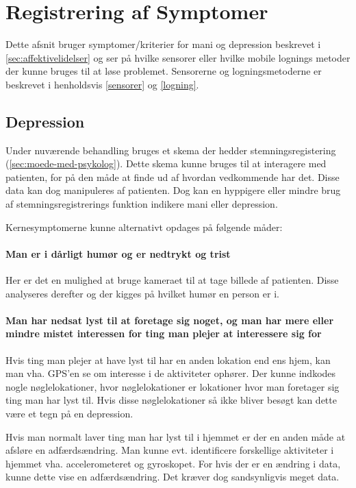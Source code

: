 \section{Registrering af Symptomer}
Dette afsnit bruger symptomer/kriterier for mani og depression beskrevet i \cref{sec:affektivelidelser} og ser på hvilke sensorer eller hvilke mobile lognings metoder der kunne bruges til at løse problemet.
Sensorerne og logningsmetoderne er beskrevet i henholdsvis \cref{sensorer} og \cref{logning}.

\subsection{Depression}
Under nuværende behandling bruges et skema der hedder stemningsregistering (\cref{sec:moede-med-psykolog}). Dette skema kunne bruges til at interagere med patienten, for på den måde at finde ud af hvordan vedkommende har det. Disse data kan dog manipuleres af patienten. Dog kan en hyppigere eller mindre brug af stemningsregistrerings funktion indikere mani eller depression.

Kernesymptomerne kunne alternativt opdages på følgende måder:

\paragraph{Man er i dårligt humør og er nedtrykt og trist}\label{darligthumor}
Her er det en mulighed at bruge kameraet til at tage billede af patienten. Disse analyseres derefter og der kigges på hvilket humør en person er i.

\paragraph{Man har nedsat lyst til at foretage sig noget, og man har mere eller mindre mistet interessen for ting man plejer at interessere sig for}
Hvis ting man plejer at have lyst til har en anden lokation end ens hjem, kan man vha. GPS'en se om interesse i de aktiviteter ophører. Der kunne indkodes nogle nøglelokationer, hvor nøglelokationer er lokationer hvor man foretager sig ting man har lyst til.
Hvis disse nøglelokationer så ikke bliver besøgt kan dette være et tegn på en depression.

Hvis man normalt laver ting man har lyst til i hjemmet er der en anden måde at afsløre en adfærdsændring. Man kunne evt. identificere forskellige aktiviteter i hjemmet vha. accelerometeret og gyroskopet. For hvis der er en ændring i data, kunne dette vise en adfærdsændring. Det kræver dog sandsynligvis meget data.

